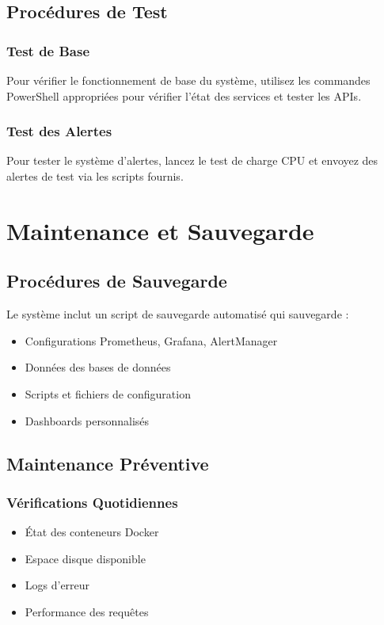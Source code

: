 \documentclass[12pt,a4paper]{report}
\begin{document}
\section{Procédures de Test}

\subsection{Test de Base}

Pour vérifier le fonctionnement de base du système, utilisez les commandes PowerShell appropriées pour vérifier l'état des services et tester les APIs.

\subsection{Test des Alertes}

Pour tester le système d'alertes, lancez le test de charge CPU et envoyez des alertes de test via les scripts fournis.

\chapter{Maintenance et Sauvegarde}

\section{Procédures de Sauvegarde}

Le système inclut un script de sauvegarde automatisé qui sauvegarde :

\begin{itemize}
    \item Configurations Prometheus, Grafana, AlertManager
    \item Données des bases de données
    \item Scripts et fichiers de configuration
    \item Dashboards personnalisés
\end{itemize}

\section{Maintenance Préventive}

\subsection{Vérifications Quotidiennes}

\begin{itemize}
    \item État des conteneurs Docker
    \item Espace disque disponible
    \item Logs d'erreur
    \item Performance des requêtes
\end{itemize}
\end{document}
